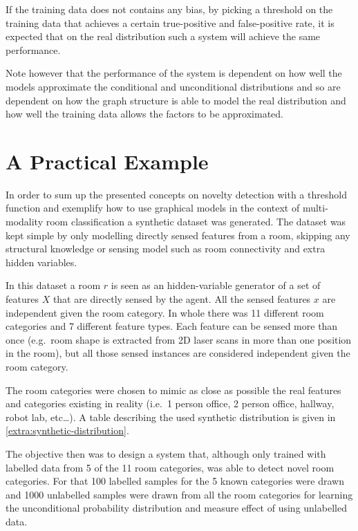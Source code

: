 If the training data does not contains any bias, by picking a threshold on the training data that achieves
a certain true-positive and false-positive rate, it is expected that on the real distribution such a system
will achieve the same performance.

Note however that the performance of the system is dependent on how well the models approximate the conditional
and unconditional distributions and so are dependent on how the graph structure is able to model the real distribution
and how well the training data allows the factors to be approximated.

\section{A Practical Example}
\label{sec:unlabelled-data}
In order to sum up the presented concepts on novelty detection with a threshold
function and exemplify how to use graphical models in the context of
multi-modality room classification a synthetic dataset was generated.
The dataset was kept simple by only modelling directly sensed features from a
room, skipping any structural knowledge or sensing model such as room
connectivity and extra hidden variables.

In this dataset a room $r$ is seen as an hidden-variable generator of a set of
features $X$ that are directly sensed by the agent.
All the sensed features $x$ are independent given the room category.
In whole there was 11 different room categories and 7 different feature types.
Each feature can be sensed more than once (e.g.\ room shape is extracted from 2D
laser scans in more than one position in the room), but all those sensed
instances are considered independent given the room category.

The room categories were chosen to mimic as close as possible the real features
and categories existing in reality (i.e.\ 1 person office, 2 person office,
hallway, robot lab, etc\dots). A table describing the used synthetic
distribution is given in \autoref{extra:synthetic-distribution}.

The objective then was to design a system that, although only trained with
labelled data from 5 of the 11 room categories, was able to detect novel
room categories.
For that 100 labelled samples for the 5 known categories were drawn and 1000 
unlabelled samples were drawn from all the room categories for learning the
unconditional probability distribution and measure effect of using unlabelled
data.

